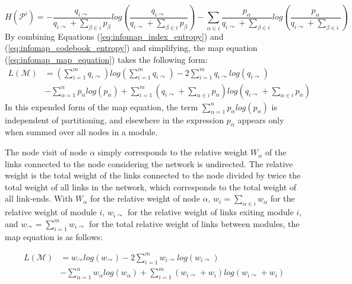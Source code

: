 {\begin{equation}\label{eq:infomap_codebook_entropy}
H(\mathcal{P}^i) = - \dfrac{q_{i\curvearrowright}}{q_{i\curvearrowright} + \sum_{\beta \in i} p_\beta} log \left(\dfrac{q_{i\curvearrowright}}{q_{i\curvearrowright} + \sum_{\beta \in i} p_\beta}\right) - \sum_{\alpha \in i} \dfrac{p_\alpha}{q_{i\curvearrowright} + \sum_{\beta \in i}} log \left(\dfrac{p_\alpha}{q_{i\curvearrowright} + \sum_{\beta \in i}}\right)
\end{equation}
By combining Equations (\ref{eq:infomap_index_entropy}) and (\ref{eq:infomap_codebook_entropy}) and simplifying, the map equation (\ref{eq:infomap_map_equation}) takes the following form:
\begin{align}
L(\mathcal{M}) &= \left(\sum_{i=1}^{m} q_{i\curvearrowright}\right) log \left(\sum_{i=1}^{m} q_{i\curvearrowright}\right) - 2 \sum_{i=1}^{m} q_{i\curvearrowright} log (q_{i\curvearrowright}) \nonumber \\
&- \sum_{\alpha=1}^{n} p_\alpha log (p_\alpha) + \sum_{i=1}^{m} \left(q_{i\curvearrowright} + \sum_{\alpha \in i} p_\alpha\right) log \left(q_{i\curvearrowright} + \sum_{\alpha \in i} p_\alpha\right)
\end{align}
In this expended form of the map equation, the term $\sum_{\alpha=1}^{n} p_\alpha log (p_\alpha)$ is independent of partitioning, and elsewhere in the expression $p_\alpha$ appears only when summed over all nodes in a module.

The node visit of node $\alpha$ simply corresponds to the relative weight $W_\alpha$ of the links connected to the node considering the network is undirected. The relative weight is the total weight of the links connected to the node divided by twice the total weight of all links in the network, which corresponds to the total weight of all link-ends. With $W_\alpha$ for the relative weight of node $\alpha$, $w_i = \sum_{\alpha \in i}w_\alpha$ for the relative weight of module $i$, $w_{i\curvearrowright}$ for the relative weight of links exiting module $i$, and $w_{\curvearrowright} = \sum_{i=1}^{m} w_{i\curvearrowright}$ for the total relative weight of links between modules, the map equation is as follows:

\begin{align}
L(\mathcal{M}) &= w_{\curvearrowright} log(w_\curvearrowright) -2\sum_{i=1}^{m} w_{i\curvearrowright} log(w_{i\curvearrowright}) \nonumber \\ &- \sum_{\alpha=1}^{n} w_\alpha log(w_\alpha) + \sum_{i=1}^{m} (w_{i\curvearrowright} + w_i) log(w_{i\curvearrowright} + w_i)
\end{align}

}
